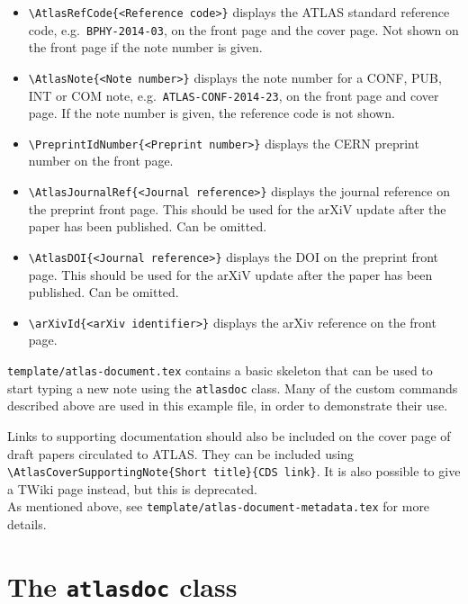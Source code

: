 \documentclass[UKenglish]{latex/atlasdoc}
\begin{document}
\begin{itemize}
  \item {\verb|\AtlasRefCode{<Reference code>}|} displays the ATLAS
    standard reference code, e.g.\ \texttt{BPHY-2014-03}, on the front page and
    the cover page. Not shown on the front page if the note number is given.

  \item {\verb|\AtlasNote{<Note number>}|} displays the note number
    for a CONF, PUB, INT or COM note, e.g.\ \texttt{ATLAS-CONF-2014-23},
    on the front page and cover page.
    If the note number is given, the reference code is not shown.

  \item {\verb|\PreprintIdNumber{<Preprint number>}|} displays the CERN
    preprint number on the front page.

  \item {\verb|\AtlasJournalRef{<Journal reference>}|} displays the journal reference
    on the preprint front page.
    This should be used for the arXiV update after the paper has been published.
    Can be omitted.

  \item {\verb|\AtlasDOI{<Journal reference>}|} displays the DOI
    on the preprint front page.
    This should be used for the arXiV update after the paper has been published.
    Can be omitted.

  \item {\verb|\arXivId{<arXiv identifier>}|} displays the arXiv reference
    on the front page.

\end{itemize}
%
\texttt{template/atlas-document.tex} contains a basic skeleton that can be
used to start typing a new note using the \texttt{atlasdoc} class. Many of
the custom commands described above are used in this example file, in
order to demonstrate their use.

Links to supporting documentation should also be included on the cover page of draft papers circulated to ATLAS.
They can be included using
\verb|\AtlasCoverSupportingNote{Short title}{CDS link}|.
It is also possible to give a TWiki page instead, but this is deprecated.\\
As mentioned above, see \texttt{template/atlas-document-metadata.tex} for more details.

\section{The \texttt{atlasdoc} class}
\label{app:atlasdoc}
\end{document}
